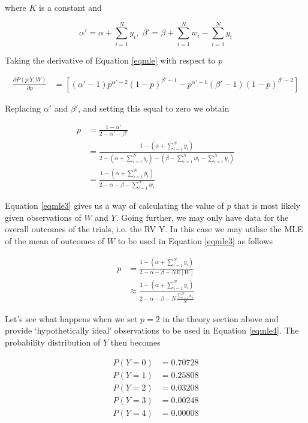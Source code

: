 \documentclass{article}
\begin{document}
\begin{flushleft}
where $K$ is a constant and

$$\alpha' = \alpha + \sum_{i=1}^N y_i,\; \beta' = \beta + \sum_{i=1}^N w_i - \sum_{i=1}^N y_i$$

Taking the derivative of Equation \ref{eqmle} with respect to $p$

\begin{equation} \label{eqmle2}
\begin{split}
\frac{\partial P(p|Y,W)}{\partial p} & = \left[  (\alpha' - 1)p^{\alpha'-2} (1-p)^{\beta'-1} - p^{\alpha'-1}(\beta'-1)(1-p)^{\beta'-2}  \right]
\end{split}
\end{equation}

Replacing $\alpha'$ and $\beta'$, and setting this equal to zero we obtain

\begin{equation} \label{eqmle3}
\begin{split}
p &= \frac{1-\alpha'}{2-\alpha'-\beta'} \\
&= \frac{1-(\alpha + \sum_{i=1}^N y_i)}{2-(\alpha + \sum_{i=1}^N y_i)-(\beta - \sum_{i=1}^N w_i - \sum_{i=1}^N y_i)} \\
&= \frac{1-(\alpha + \sum_{i=1}^N y_i)}{2-\alpha-\beta-\sum_{i=1}^N w_i}
\end{split}
\end{equation}

Equation \ref{eqmle3} gives us a way of calculating the value of $p$ that is most likely given observations of $W$ and $Y$. Going further, we may only have data for the overall outcomes of the trials, i.e. the RV Y. In this case we may utilise the MLE of the mean of outcomes of $W$ to be used in Equation \ref{eqmle3} as follows

\begin{equation} \label{eqmle4}
\begin{split}
p &= \frac{1-(\alpha + \sum_{i=1}^N y_i)}{2-\alpha-\beta-N E[W]} \\
&\approx \frac{1-(\alpha + \sum_{i=1}^N y_i)}{2-\alpha-\beta-N \frac{\sum_{i=1}^N w_i}{N}}
\end{split}
\end{equation}

Let's see what happens when we set $p=2$ in the theory section above and provide `hypothetically ideal' observations to be used in Equation \ref{eqmle4}. The probability distribution of $Y$ then becomes

\begin{equation} \label{eqYpdf}
\begin{split}
P(Y=0) &= 0.70728 \\
P(Y=1) &= 0.25808 \\
P(Y=2) &= 0.03208 \\
P(Y=3) &= 0.00248 \\
P(Y=4) &= 0.00008
\end{split}
\end{equation}


\end{flushleft}
\end{document}
